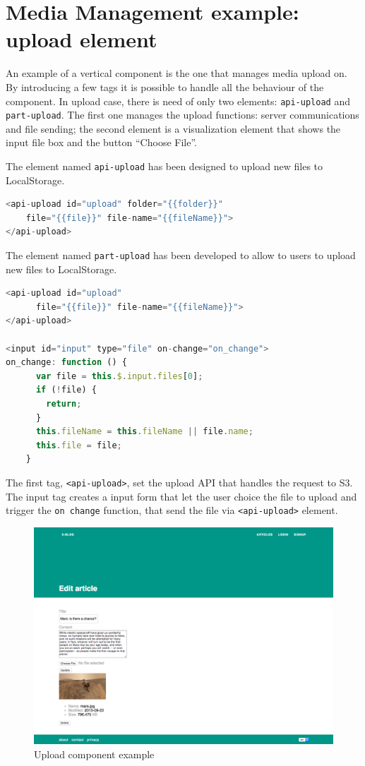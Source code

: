 \section{Media Management example: upload element}
\label{sec:XPR_exmpl_b}

An example of a vertical component is the one that manages media upload on. By introducing a few tags it is possible to handle all the behaviour of the component. In upload case, there is need of only two elements: \texttt{api-upload} and \texttt{part-upload}.
The first one manages the upload functions: server communications and file sending; the second element is a visualization element that shows the input file box and the button ``Choose File''.


The element named \texttt{api-upload} has been designed to upload new files to LocalStorage.
\begin{lstlisting}[language=javascript]
<api-upload id="upload" folder="{{folder}}"
	file="{{file}}" file-name="{{fileName}}">
</api-upload>
\end{lstlisting} 


The element named \texttt{part-upload} has been developed to allow to users to upload new files to LocalStorage.

\begin{lstlisting}[language=javascript]
<api-upload id="upload"
      file="{{file}}" file-name="{{fileName}}">
</api-upload>

<input id="input" type="file" on-change="on_change">
on_change: function () {
      var file = this.$.input.files[0];
      if (!file) {
        return;
      }
      this.fileName = this.fileName || file.name;
      this.file = file;
    }

\end{lstlisting}

The first tag, \texttt{<api-upload>}, set the upload API that handles the request to S3.
The input tag creates a input form that let the user choice the file to upload and trigger the \texttt{on change} function, that send the file via \texttt{<api-upload>} element.



\begin {figure}[h]
\graphicspath{{images/chapter_s3/}}
\includegraphics[width=\textwidth]{s3_example}
\caption{Upload component example}
\end {figure}
